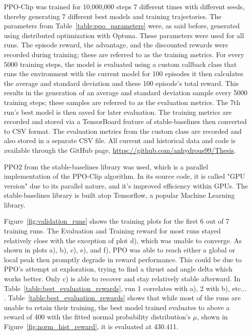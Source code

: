 PPO-Clip was trained for 10,000,000 steps 7 different times with different seeds, thereby generating 7 different best models and training trajectories. The parameters from Table~\ref{table:ppo_parameters} were, as said before, generated using distributed optimization with Optuna. These parameters were used for all runs. The episode reward, the advantage, and the discounted rewards were recorded during training; these are referred to as the training metrics. For every 5000 training steps, the model is evaluated using a custom callback class that runs the environment with the current model for 100 episodes it then calculates the average and standard deviation and these 100 episode's total reward. This results in the generation of an average and standard deviation sample every 5000 training steps; these samples are referred to as the evaluation metrics. The 7th run's best model is then saved for later evaluation. The training metrics are recorded and stored via a TensorBoard feature of stable-baselines then converted to CSV format. The evaluation metrics from the custom class are recorded and also stored in a separate CSV file. All current and historical data and code is available through the GitHub page, \href{https://github.com/anhydrous99/Thesis}{https://github.com/anhydrous99/Thesis}.

PPO2 from the stable-baselines library was used, which is a parallel implementation of the PPO-Clip algorithm. In its source code, it is called "GPU version" due to its parallel nature, and it's improved efficiency within GPUs. The stable-baselines library is built atop Tensorflow, a popular Machine Learning library.

Figure~\ref{fig:validation_runs} shows the training plots for the first 6 out of 7 training runs. The Evaluation and Training reward for most runs stayed relatively close with the exception of plot d), which was unable to converge. As shown in plots a), b), c), e), and f), PPO was able to reach either a global or local peak then promptly degrade in reward performance. This could be due to PPO's attempt at exploration, trying to find a thrust and angle delta which works better. Only c) is able to recover and stay relatively stable afterward. In Table~\ref{table:best_evaluation_rewards}, run 1 correlates with a), 2 with b), etc... . Table~\ref{table:best_evaluation_rewards} shows that while most of the runs are unable to retain their training, the best model trained evaluates to above a reward of 400 with the fitted normal probability distribution's $\mu$, shown in Figure~\ref{fig:norm_hist_reward}, it is evaluated at 430.411.

